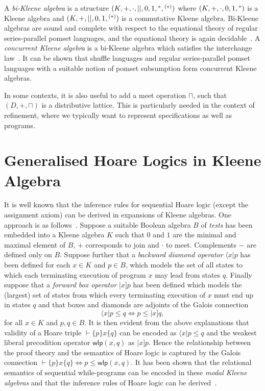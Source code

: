 \documentclass{llncs}
\begin{document}
A \emph{bi-Kleene algebra} is a structure
$(K,+,\cdot,||,0,1,\hphantom{}^*,\hphantom{}^{(*)})$ where
$(K,+,\cdot,0,1,\hphantom{}^*)$ is a Kleene algebra and
$(K,+,||,0,1,\hphantom{}^{(*)})$ is a commutative Kleene
algebra. Bi-Kleene algebras are sound and complete with respect to the
equational theory of regular series-parallel pomset languages, and the
equational theory is again decidable~\cite{LaurenceStruth}. A
\emph{concurrent Kleene algebra} is a bi-Kleene algebra which
satisfies the interchange law~\cite{hoare_concurrent_2011}. It can be shown that
shuffle languages and regular series-parallel pomset languages with a
suitable notion of pomset subsumption form concurrent Kleene algebras.

In some contexts, it is also useful to add a meet operation $\sqcap$,
such that $(D,+,\sqcap)$ is a distributive lattice. This is
particularly needed in the context of refinement, where we typically
want to represent specifications as well as programs.


\section{Generalised Hoare Logics  in Kleene Algebra}

It is well known that the inference rules for sequential Hoare logic
(except the assignment axiom) can be derived in expansions of Kleene
algebras. One approach is as follows~\cite{moller_algebras_2006}. Suppose a
suitable Boolean algebra $B$ of \emph{tests} has been embedded into a
Kleene algebra $K$ such that $0$ and $1$ are the minimal and maximal
element of $B$, $+$ corresponds to join and $\cdot$ to
meet. Complements $-$ are defined only on $B$. Suppose further that a
\emph{backward diamond operator} $\langle x|p$ has been defined for
each $x\in K$ and $p\in B$, which models the set of all states to
which each terminating execution of program $x$ may lead from states
$q$. Finally suppose that a \emph{forward box operator} $|x]p$ has
been defined which models the (largest) set of states from which every
terminating execution of $x$ must end up in states $q$ and that boxes
and diamonds are adjoints of the Galois connection
\begin{equation*}
  \langle x|p \le q \Leftrightarrow p \le |x]q,
\end{equation*}
for all $x\in K$ and $p,q\in B$. It is then evident from the above
explanations that validity of a Hoare triple $\vdash \{p\}x\{q\}$ can
be encoded as $\langle x|p \le q$ and the weakest liberal precodition
operator $\mathsf{wlp}(x,q)$ as $|x]p$. Hence the relationship between
the proof theory and the semantics of Hoare logic is captured by the
Galois connection $ \vdash\{p\}x\{q\} \Leftrightarrow p \le
\mathsf{wlp}(x,q)$. It has been shown that the relational semantics of
sequential while-programs can be encoded in these \emph{modal Kleene
  algebras} and that the inference rules of Hoare logic can be
derived~\cite{moller_algebras_2006}.
\end{document}
